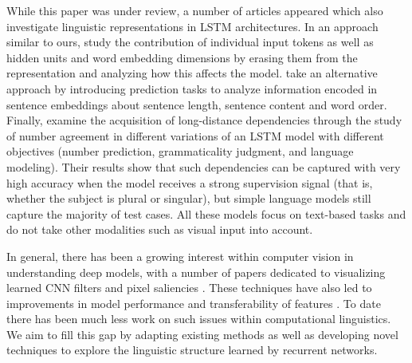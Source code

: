 While this paper was under review, a number of articles appeared which also 
investigate linguistic representations in LSTM architectures. In an 
approach similar to ours,  study the contribution of 
individual input tokens as well as hidden units and word embedding dimensions 
by erasing them from the representation and analyzing how this affects the model.
 take an alternative approach by introducing prediction tasks 
to analyze information encoded in sentence embeddings about sentence length, 
sentence content and word order. Finally,  examine 
the acquisition of long-distance dependencies through the study of number agreement 
in different variations of an LSTM model with different objectives (number prediction, 
grammaticality judgment, and language modeling). Their results show that such dependencies 
can be captured with very high accuracy when the model receives a strong supervision 
signal (that is, whether the subject is plural or singular), but simple language models still capture 
the majority of test cases. All these models focus on text-based tasks and do not take other 
modalities such as visual input into account.

In general, there has been a growing interest within computer vision
in understanding deep models, with a number of papers dedicated to
visualizing learned CNN filters and pixel saliencies
\cite{simonyan2013deep,yosinski2015understanding,mahendran2015understanding}. These
techniques have also led to improvements in model performance
\cite{eigen2013understanding} and transferability of features
\cite{zhou2014object}. To date there has been much less work on such
issues within computational linguistics. We aim to fill this gap by
adapting existing methods as well as developing novel techniques to
explore the linguistic structure learned by recurrent networks.
